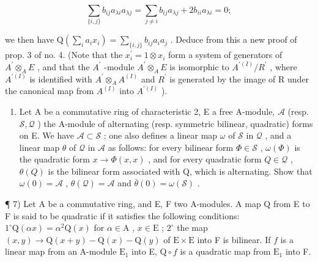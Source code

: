 \[
\sum_ {\{i, j \}} b _ {i j} a _ {\lambda i} a _ {\lambda j} = \sum_ {j \neq i} b _ {i j} a _ {\lambda j} + 2 b _ {i i} a _ {\lambda i} = 0;\tag{3}
\]

we then have \(\mathrm{Q}(\sum_{i}a_{i}x_{i})=\sum_{\{i,j\}}b_{ij}a_{i}a_{j}\) . Deduce from this a new proof of prop. 3 of no. 4. (Note that the \(x_{i}^{\prime}=1\otimes x_{i}\) form a system of generators of \(A^{\prime}\otimes_{A}E\) , and that the \(A^{\prime}\) -module \(A^{\prime}\otimes_{A}E\) is isomorphic to \(A^{\prime(I)}/R^{\prime}\) , where \(A^{\prime(I)}\) is identified with \(A^{\prime}\otimes_{A}A^{(I)}\) and \(R^{\prime}\) is generated by the image of R under the canonical map from \(A^{(I)}\) into \(A^{\prime(I)}\) ).

\begin{enumerate}
\def\labelenumi{\arabic{enumi})}
\setcounter{enumi}{5}
\tightlist
\item
  Let A be a commutative ring of characteristic 2, E a free A-module, \(\mathcal{A}\) (resp. \(\mathcal{S},\mathcal{Q}\) ) the A-module of alternating (resp. symmetric bilinear, quadratic) forms on E. We have \(\mathcal{A}\subset\mathcal{S}\) ; one also defines a linear map \(\omega\) of \(\mathcal{S}\) in \(\mathcal{Q}\) , and a linear map \(\theta\) of \(\mathcal{Q}\) in \(\mathcal{A}\) as follows: for every bilinear form \(\Phi\in\mathcal{S}\) , \(\omega(\Phi)\) is the quadratic form \(x\to\Phi(x,x)\) , and for every quadratic form \(Q\in\mathcal{Q}\) , \(\theta(Q)\) is the bilinear form associated with Q, which is alternating. Show that \(\omega(0)=\mathcal{A}\) , \(\theta(\mathcal{Q})=\mathcal{A}\) and \(\bar{\theta}(0)=\omega(\mathcal{S})\) .
\end{enumerate}

¶ 7) Let A be a commutative ring, and E, F two A-modules. A map Q from E to F is said to be quadratic if it satisfies the following conditions: \(1^{\circ} \mathrm{Q}(\alpha x) = \alpha^{2} \mathrm{Q}(x)\) for \(\alpha \in \mathrm{A}\) , \(x \in \mathrm{E}\) ; \(2^{\circ}\) the map \((x, y) \to \mathrm{Q}(x + y) - \mathrm{Q}(x) - \mathrm{Q}(y)\) of \(\mathrm{E} \times \mathrm{E}\) into F is bilinear. If \(f\) is a linear map from an A-module \(\mathrm{E}_{1}\) into E, \(\mathrm{Q} \circ f\) is a quadratic map from \(\mathrm{E}_{1}\) into F.

